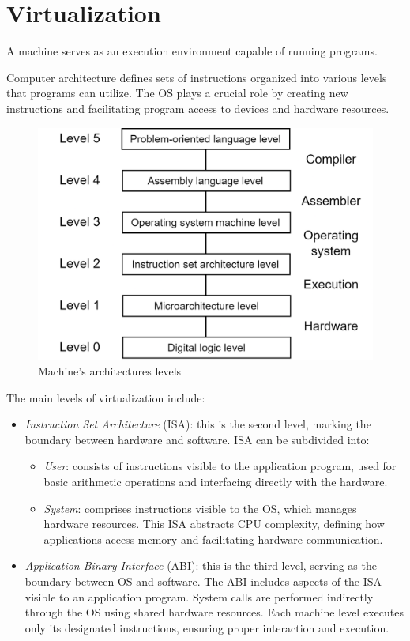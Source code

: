 \section{Virtualization}

\begin{definition}
    A machine serves as an execution environment capable of running programs.
\end{definition}
Computer architecture defines sets of instructions organized into various levels that programs can utilize.
The OS plays a crucial role by creating new instructions and facilitating program access to devices and hardware resources.

\begin{figure}[H]
    \centering
    \includegraphics[width=0.5\linewidth]{images/lev.png}
    \caption{Machine's architectures levels}
\end{figure}

The main levels of virtualization include:
\begin{itemize}
    \item \textit{Instruction Set Architecture} (ISA): this is the second level, marking the boundary between hardware and software.
        ISA can be subdivided into:
        \begin{itemize}
            \item \textit{User}: consists of instructions visible to the application program, used for basic arithmetic operations and interfacing directly with the hardware.
            \item \textit{System}: comprises instructions visible to the OS, which manages hardware resources.
                This ISA abstracts CPU complexity, defining how applications access memory and facilitating hardware communication.
        \end{itemize}
    \item \textit{Application Binary Interface} (ABI): this is the third level, serving as the boundary between OS and software.
        The ABI includes aspects of the ISA visible to an application program. 
        System calls are performed indirectly through the OS using shared hardware resources.
        Each machine level executes only its designated instructions, ensuring proper interaction and execution.
\end{itemize}

